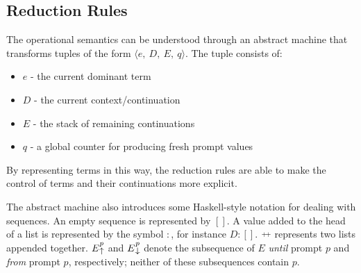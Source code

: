   \begin{figure}[!h]
  \end{figure}

  \subsection{Reduction Rules}
  
  The operational semantics can be understood through an abstract machine that transforms tuples of the form $\langle e,\ D,\ E,\ q \rangle$.
  The tuple consists of:
    \begin{itemize}
      \item $e$ - the current dominant term
      \item $D$ - the current context/continuation
      \item $E$ - the stack of remaining continuations
      \item $q$ - a global counter for producing fresh prompt values
    \end{itemize}
  By representing terms in this way, 
  the reduction rules are able to make the control of terms and their continuations more explicit.
  
  The abstract machine also introduces some Haskell-style notation for dealing with sequences. An empty sequence is represented by $[]$. 
  A value added to the head of a list is represented by the symbol $:$, for instance $D:[]$. $\app$ represents two lists appended together. 
  $E\until{p}$ and $E\from{p}$ denote the subsequence of $E$ \emph{until} prompt $p$ and \emph{from} prompt $p$, respectively; 
  neither of these subsequences contain $p$.

